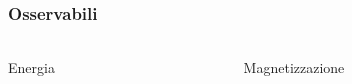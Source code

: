 \begin{frame}
    \frametitle{Osservabili}
    \framesubtitle{}

    \begin{columns}
        \begin{column}{0.5\textwidth}
            \begin{block}{Energia}

            \end{block}
        \end{column}
    
        \begin{column}{0.5\textwidth}
            \begin{block}{Magnetizzazione}

            \end{block}
        \end{column}
    \end{columns}

\end{frame}
